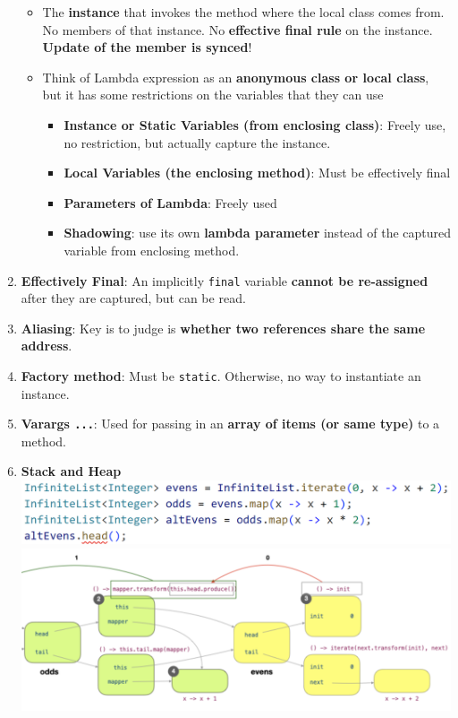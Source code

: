\documentclass[10pt, landscape]{article}
\begin{document}
\begin{multicols}{4}
\begin{enumerate}
\begin{itemize}
        \item The \textbf{instance} that invokes the method where the local class comes from. No members of that instance. No \textbf{effective final rule} on the instance. \textbf{Update of the member is synced}!
        \item Think of Lambda expression as an \textbf{anonymous class or local class}, but it has some restrictions on the variables that they can use
        \begin{itemize}
            \item \textbf{Instance or Static Variables (from enclosing class)}: Freely use, no restriction, but actually capture the instance.
            \item \textbf{Local Variables (the enclosing method)}: Must be effectively final
            \item \textbf{Parameters of Lambda}: Freely used
            \item \textbf{Shadowing}: use its own \textbf{lambda parameter} instead of the captured variable from enclosing method.
        \end{itemize}
    \end{itemize}
    \item \textbf{Effectively Final}: An implicitly \texttt{final} variable \textbf{cannot be re-assigned} after they are captured, but can be read.
    \item \textbf{Aliasing}: Key is to judge is \textbf{whether two references share the same address}.
    \item \textbf{Factory method}: Must be \texttt{static}. Otherwise, no way to instantiate an instance.
    \item \textbf{Varargs \texttt{...}}: Used for passing in an \textbf{array of items (or same type)} to a method.
    \item \textbf{Stack and Heap} \\
    \includegraphics[width=1\linewidth]{Paper/Final/images/2.png} \\
    \includegraphics[width=1\linewidth]{Paper/Final/images/3.png} \\

\end{enumerate}
\end{multicols}
\end{document}
